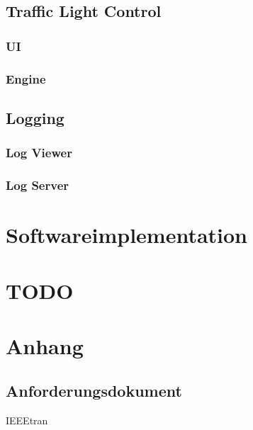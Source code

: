 \documentclass[12pt,a4paper,bibliography=totocnumbered,listof=totocnumbered]{scrartcl}
\begin{document}
\subsection{Traffic Light Control}
\subsubsection{UI}
\subsubsection{Engine}
\subsection{Logging}
\subsubsection{Log Viewer}
\subsubsection{Log Server}
\newpage
\section{Softwareimplementation}
\sloppy

\newpage
\section{TODO}

\section{Anhang}
\subsection{Anforderungsdokument}  \label{Anforderungsdokument}

\sloppy

\newpage



\pagebreak



\renewcommand{\centermark}{}
\renewcommand\refname{Quellenverzeichnis}
 {IEEEtran}

\end{document}
